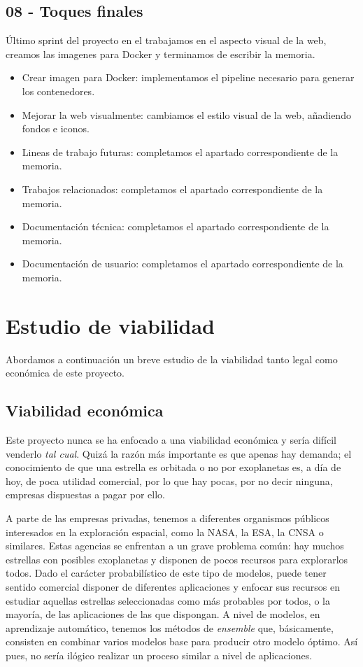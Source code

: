 \subsection{08 - Toques finales 
\newline[02/06/2020 – 31/05/2020]}

Último sprint del proyecto en el trabajamos en el aspecto visual de la web, creamos las imagenes para Docker y terminamos de escribir la memoria.

\begin{itemize}
    \item Crear imagen para Docker: implementamos el pipeline necesario para generar los contenedores.
    \item Mejorar la web visualmente: cambiamos el estilo visual de la web, añadiendo fondos e iconos.
    \item Lineas de trabajo futuras: completamos el apartado correspondiente de la memoria.
    \item Trabajos relacionados: completamos el apartado correspondiente de la memoria.
    \item Documentación técnica: completamos el apartado correspondiente de la memoria.
    \item Documentación de usuario: completamos el apartado correspondiente de la memoria.
\end{itemize}

\section{Estudio de viabilidad}

Abordamos a continuación un breve estudio de la viabilidad tanto legal como económica de este proyecto.

\subsection{Viabilidad económica}

Este proyecto nunca se ha enfocado a una viabilidad económica y sería difícil venderlo \textit{tal cual}. Quizá la razón más importante es que apenas hay demanda; el conocimiento de que una estrella es orbitada o no por exoplanetas es, a día de hoy, de poca utilidad comercial, por lo que hay pocas, por no decir ninguna, empresas dispuestas a pagar por ello.

A parte de las empresas privadas, tenemos a diferentes organismos públicos interesados en la exploración espacial, como la NASA, la ESA, la CNSA o similares. Estas agencias se enfrentan a un grave problema común: hay muchos estrellas con posibles exoplanetas y disponen de pocos recursos para explorarlos todos. Dado el carácter probabilístico de este tipo de modelos, puede tener sentido comercial disponer de diferentes aplicaciones y enfocar sus recursos en estudiar aquellas estrellas seleccionadas como más probables por todos, o la mayoría, de las aplicaciones de las que dispongan. A nivel de modelos, en aprendizaje automático, tenemos los métodos de \textit{ensemble} que, básicamente, consisten en combinar varios modelos base para producir otro modelo óptimo. Así pues, no sería ilógico realizar un proceso similar a nivel de aplicaciones.

